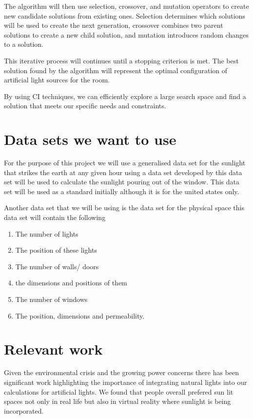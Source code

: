 \documentclass{article}
\begin{document}
The algorithm will then use selection, crossover, and mutation operators to create new candidate solutions from existing ones. Selection determines which solutions will be used to create the next generation, crossover combines two parent solutions to create a new child solution, and mutation introduces random changes to a solution.

This iterative process will continues until a stopping criterion is met. The best solution found by the algorithm will represent the optimal configuration of artificial light sources for the room.

By using CI techniques, we can efficiently explore a large search space and find a solution that meets our specific needs and constraints.

\section{Data sets we want to use}

For the purpose of this project we will use a generalised data set for the sunlight that strikes the earth at any given hour using a data set developed by \cite{perez_ineichen_seals_michalsky_stewart_1990} this data set will be used to calculate the sunlight pouring out of the window. This data set will be used as a standard initially although it is for the united states only. 

Another data set that we will be using is the data set for the physical space this data set will contain the following 

\begin{enumerate}
    \item The number of lights 
    \item The position of these lights 
    \item The number of walls/ doors 
    \item the dimensions and positions of them 
    \item The number of windows 
    \item The position, dimensions and permeability.
\end{enumerate}

\section{Relevant work}

Given the environmental crisis and the growing power concerns there has been significant work highlighting the importance of integrating natural lights into our calculations for artificial lights. We found that people overall prefered sun lit spaces not only in real life but also in virtual reality where sunlight is being incorporated. \cite{hegazy_ichiriyama_yasufuku_abe_2021} \cite{galasiu_veitch_2006}
\end{document}
